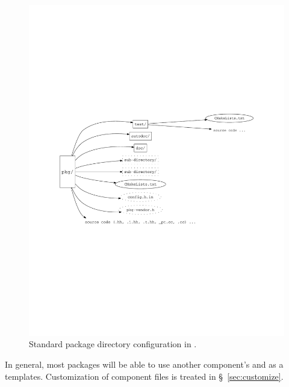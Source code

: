 \begin{figure}[htbp]
  \begin{center}
    \includegraphics[clip, trim=1cm 9cm 1cm 9cm,width=6.5in]{fig/package} %
    \caption{Standard package directory configuration in \draco.}
    \label{fig:package}
  \end{center}
\end{figure}
In general, most packages will be able to use another component's  and  as a templates.  Customization of 
component   files is treated in \S~\ref{sec:customize}.

